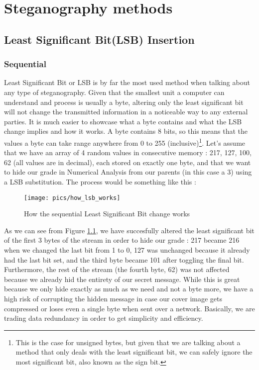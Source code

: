 
\chapter{Steganography methods}


\section{Least Significant Bit(LSB) Insertion}
\begin{multicols*}{2}
\subsection{Sequential}
\setlength\columnsep{20pt}

Least Significant Bit or LSB is by far the most used method when talking about any type of steganography. Given that the smallest unit a computer can understand and process is usually a byte, altering only the least significant bit will not change the transmitted information in a noticeable way to any external parties. It is much easier to showcase what a byte contains and what the LSB change implies and how it works. A byte contains 8 bits, so this means that the values a byte can take range anywhere from 0 to 255 (inclusive)\footnote{This is the case for unsigned bytes, but given that we are talking about a method that only deals with the least significant bit, we can safely ignore the most significant bit, also known as the sign bit.}. Let's assume that we have an array of 4 random values in consecutive memory : 217, 127, 100, 62 (all values are in decimal), each stored on exactly one byte, and that we want to hide our grade in Numerical Analysis from our parents (in this case a 3) using a LSB substitution. The process would be something like this :

\begin{figure}[H]
    \centering
    \texttt{[image: pics/how\_lsb\_works]}
    \caption{How the sequential Least Significant Bit change works}
    \label{LSB}
\end{figure}

As we can see from Figure \ref{LSB}, we have succesfully altered the least significant bit of the first 3 bytes of the stream in order to hide our grade : 217 became 216 when we changed the last bit from 1 to 0, 127 was unchanged because it already had the last bit set, and the third byte became 101 after toggling the final bit. Furthermore, the rest of the stream (the fourth byte, 62) was not affected because we already hid the entirety of our secret message. While this is great because we only hide exactly as much as we need and not a byte more, we have a high risk of corrupting the hidden message in case our cover image gets compressed or loses even a single byte when sent over a network. Basically, we are trading data redundancy in order to get simplicity and efficiency.


\end{multicols*}
